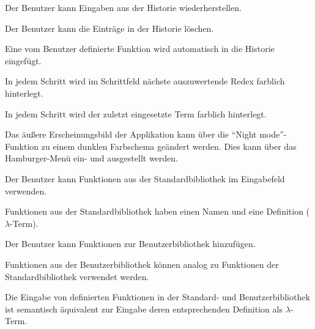 \documentclass[parskip=full,11pt,twoside]{scrartcl}
\begin{document}
Der Benutzer kann Eingaben aus der Historie wiederherstellen.

Der Benutzer kann die Einträge in der Historie löschen.

Eine vom Benutzer definierte Funktion wird automatisch in die Historie eingefügt.

In jedem Schritt wird im Schrittfeld nächste auszuwertende Redex farblich hinterlegt.

In jedem Schritt wird der zuletzt eingesetzte Term farblich hinterlegt.

Das äußere Erscheinungsbild der Applikation kann über die \enquote{Night mode}-Funktion zu einem dunklen Farbschema geändert werden. Dies kann über das Hamburger-Menü ein- und ausgestellt werden.

Der Benutzer kann Funktionen aus der Standardbibliothek im Eingabefeld verwenden.

Funktionen aus der Standardbibliothek haben einen Namen und eine Definition ($\lambda$-Term).

Der Benutzer kann Funktionen zur Benutzerbibliothek hinzufügen.

Funktionen aus der Benutzerbibliothek können analog zu Funktionen der Standardbibliothek verwendet werden.

Die Eingabe von definierten Funktionen in der Standard- und Benutzerbibliothek ist semantisch äquivalent zur Eingabe deren entsprechenden Definition als $\lambda$-Term.
\end{document}

